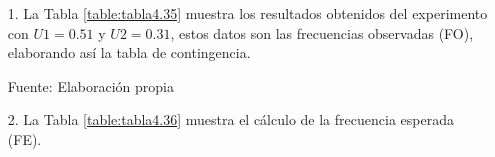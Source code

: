 \begin{enumerate}
\item[1.] La Tabla \ref{table:tabla4.35} muestra los resultados obtenidos del experimento con $U1 = 0.51$ y $U2 = 0.31$, estos datos son las frecuencias observadas (FO), elaborando así la tabla de contingencia.

\begin{center}
\begin{table}[H]
\centering
\caption{\small{Tabla de contingencia o de frecuencias observadas.}}
\label{table:tabla4.35}
\vskip 0.2cm
\begin{center}
\vskip 0.2cm
{\small{Fuente: Elaboración propia}}
\end{center}
\end{table}
\end{center}

\item[2.] La Tabla \ref{table:tabla4.36} muestra el cálculo de la frecuencia esperada (FE).


\end{enumerate}

